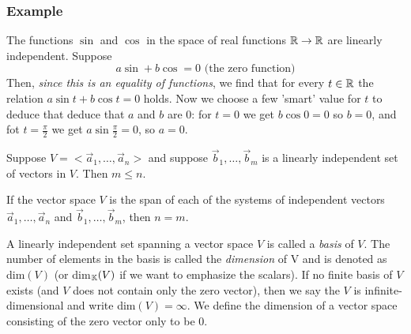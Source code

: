 \subsubsection{Example} The functions $\sin$ and $ \cos $ in the space of real functions $ \mathbb{R} \rightarrow \mathbb{R}$ are linearly independent. Suppose
$$ a\sin + b\cos = 0 \text{ (the zero function)} $$
Then, \emph{since this is an equality of functions}, we find that for every $ t \in \mathbb{R} $ the relation $ a\sin{t} + b\cos{t} = 0 $ holds.
Now we choose a few 'smart' value for $t$ to deduce that deduce that $a$ and $b$ are $0$: for $t=0$ we get $ b\cos{0} = 0 $ so $ b=0 $, and
fot $ t=\frac{\pi}{2} $ we get $ a\sin{\frac{\pi}{2}} = 0 $, so $ a = 0 $.

\begin{theorem}[]
    Suppose $ V = <\vec{a}_1,\dots,\vec{a}_n> $ and suppose $ \vec{b}_1,\dots,\vec{b}_m $ is a linearly independent set of vectors in $V$. Then $ m \le n $.
\end{theorem}

\begin{theorem}[]
    If the vector space $V$ is the span of each of the systems of independent vectors $ \vec{a}_1,\dots,\vec{a}_n $ and $ \vec{b}_1,\dots,\vec{b}_m $, then $ n = m $.
\end{theorem}

\begin{definition}
    A linearly independent set spanning a vector space $V$ is called a \emph{basis} of $V$.
    The number of elements in the basis is called the \emph{dimension} of V and is denoted as dim$(V)$ (or dim$_{\mathbb{K}}(V)$ if we want to emphasize the scalars).
    If no finite basis of $V$ exists (and $V$ does not contain only the zero vector), then we say the $V$ is infinite-dimensional and write dim$(V) = \infty$.
    We define the dimension of a vector space consisting of the zero vector only to be 0.
\end{definition}



